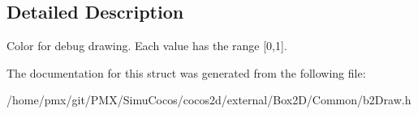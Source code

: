 \subsection{Detailed Description}
Color for debug drawing. Each value has the range \mbox{[}0,1\mbox{]}. 

The documentation for this struct was generated from the following file\+:\begin{DoxyCompactItemize}
\item 
/home/pmx/git/\+P\+M\+X/\+Simu\+Cocos/cocos2d/external/\+Box2\+D/\+Common/b2\+Draw.\+h\end{DoxyCompactItemize}
